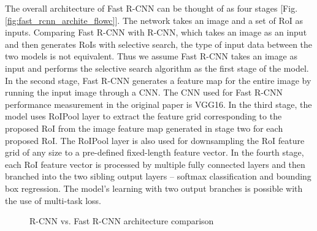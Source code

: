 The overall architecture of Fast R-CNN can be thought of as four stages [Fig. \ref{fig:fast_rcnn_archite_flowc}]. The network takes an image and a set of RoI as inputs. Comparing Fast R-CNN with R-CNN, which takes an image as an input and then generates RoIs with selective search, the type of input data between the two models is not equivalent. Thus we assume Fast R-CNN takes an image as input and performs the selective search algorithm as the first stage of the model. In the second stage, Fast R-CNN generates a feature map for the entire image by running the input image through a CNN. The CNN used for Fast R-CNN performance measurement in the original paper is VGG16. In the third stage, the model uses RoIPool layer to extract the feature grid corresponding to the proposed RoI from the image feature map generated in stage two for each proposed RoI. The RoIPool layer is also used for downsampling the RoI feature grid of any size to a pre-defined fixed-length feature vector. In the fourth stage, each RoI feature vector is processed by multiple fully connected layers and then branched into the two sibling output layers -- softmax classification and bounding box regression. The model's learning with two output branches is possible with the use of multi-task loss.

\begin{figure}[!ht]
    \centering
    \caption{R-CNN vs. Fast R-CNN architecture comparison \cite{rcnn_vs_faster_custom_fig}} \label{fig:rcnn_vs_fast}
\end{figure}

